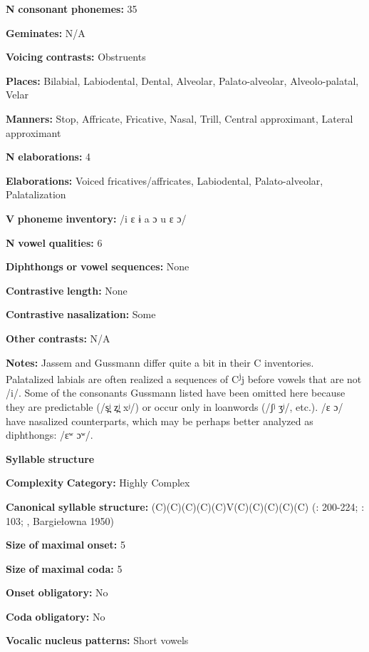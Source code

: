 \begin{styleBody}
\textbf{N} \textbf{consonant} \textbf{phonemes:} 35

\textbf{Geminates:} N/A

\textbf{Voicing} \textbf{contrasts:} Obstruents

\textbf{Places:} Bilabial, Labiodental, Dental, Alveolar, Palato-alveolar, Alveolo-palatal, Velar

\textbf{Manners:} Stop, Affricate, Fricative, Nasal, Trill, Central approximant, Lateral approximant

\textbf{N} \textbf{elaborations:} 4

\textbf{Elaborations:} Voiced fricatives/affricates, Labiodental, Palato-alveolar, Palatalization

\textbf{V} \textbf{phoneme} \textbf{inventory:} /i ɛ ɨ a ɔ u ɛ ɔ/

\textbf{N} \textbf{vowel} \textbf{qualities:} 6

\textbf{Diphthongs} \textbf{or} \textbf{vowel} \textbf{sequences:} None

\textbf{Contrastive} \textbf{length:} None

\textbf{Contrastive} \textbf{nasalization:} Some

\textbf{Other} \textbf{contrasts:} N/A

\textbf{Notes:} Jassem and Gussmann differ quite a bit in their C inventories. Palatalized labials are often realized a sequences of C\textsuperscript{j}j before vowels that are not /i/. Some of the consonants Gussmann listed have been omitted here because they are predictable (/s̪ʲ z̪ʲ xʲ/) or occur only in loanwords (/ʃʲ ʒʲ/, etc.). /ɛ ɔ/ have nasalized counterparts, which may be perhaps better analyzed as diphthongs: /ɛʷ ɔʷ/.

\textbf{Syllable} \textbf{structure}

\textbf{Complexity} \textbf{Category:} Highly Complex

\textbf{Canonical} \textbf{syllable} \textbf{structure:} (C)(C)(C)(C)(C)V(C)(C)(C)(C)(C) (\citealt{Gussmann2007}: 200-224; \citealt{Jassem2003}: 103; \citealt{Zydorowicz2010}, Bargiełowna 1950)

\textbf{Size} \textbf{of} \textbf{maximal} \textbf{onset:} 5

\textbf{Size} \textbf{of} \textbf{maximal} \textbf{coda:} 5

\textbf{Onset} \textbf{obligatory:} No

\textbf{Coda} \textbf{obligatory:} No

\textbf{Vocalic} \textbf{nucleus} \textbf{patterns:} Short vowels


\end{styleBody}
